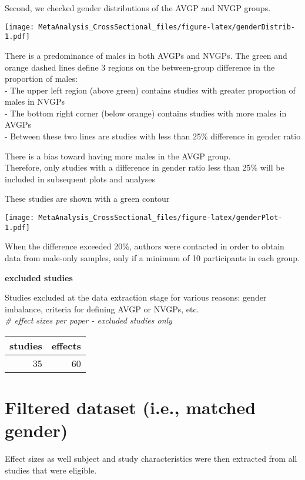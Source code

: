 \documentclass[
]{book}
\begin{document}
Second, we checked gender distributions of the AVGP and NVGP groups.

\texttt{[image: MetaAnalysis\_CrossSectional\_files/figure-latex/genderDistrib-1.pdf]}

There is a predominance of males in both AVGPs and NVGPs.
The green and orange dashed lines define 3 regions on the between-group difference
in the proportion of males:\\
- The upper left region (above green) contains studies with greater proportion of males in NVGPs\\
- The bottom right corner (below orange) contains studies with more males in AVGPs\\
- Between these two lines are studies with less than 25\% difference in gender ratio

There is a bias toward having more males in the AVGP group.\\
Therefore, only studies with a difference in gender ratio less than 25\%
will be included in subsequent plots and analyses

These studies are shown with a green contour

\texttt{[image: MetaAnalysis\_CrossSectional\_files/figure-latex/genderPlot-1.pdf]}

When the difference exceeded 20\%, authors were contacted in order to obtain data
from male-only samples, only if a minimum of 10 participants in each group.

\textbf{excluded studies}

Studies excluded at the data extraction stage for various reasons: gender imbalance, criteria for defining AVGP or NVGPs, etc.\\
\emph{\# effect sizes per paper - excluded studies only}

\begin{table}
\centering
\begin{tabular}{r|r}
\hline
studies & effects\\
\hline
35 & 60\\
\hline
\end{tabular}
\end{table}

\hypertarget{cleandata}{%
\section{Filtered dataset (i.e., matched gender)}\label{cleandata}}

Effect sizes as well subject and study characteristics were then extracted from all studies that were eligible.
\end{document}

